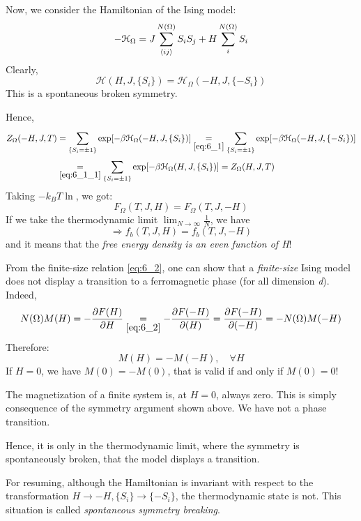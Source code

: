 \documentclass[../../Main/Main.tex]{subfiles}
\begin{document}
Now, we consider the Hamiltonian of the Ising model:
\begin{equation*}
  - \mathcal{H}_ \Omega  = J \sum_{\expval{ij} }^{N(\Omega )} S_i S_j + H \sum_{i}^{N(\Omega )} S_i
\end{equation*}
Clearly,
\begin{equation}
  \mathcal{H}(H,J, \{S_i\}) =   \mathcal{H}_ \Omega (-H,J, \{-S_i\})
  \label{eq:6_1_1}
\end{equation}
This is a spontaneous broken symmetry.

Hence,
\begin{equation}
  \begin{split}
Z_ \Omega  (-H,J,T) &= \sum_{ \{S_i = \pm 1 \}}^{} \exp [-\beta \mathcal{H}_ \Omega  (-H,J, \{S_i\})]  \underset{\eqref{eq:6_1}}{=}   \sum_{ \{S_i = \pm 1 \}}^{} \exp [-\beta \mathcal{H}_ \Omega  (-H,J,\{-S_i\})] \\
&\underset{\eqref{eq:6_1_1}}{=} \sum_{ \{S_i= \pm 1\}}^{} \exp [-\beta \mathcal{H}_ \Omega  (H,J, \{S_i\}) ] = Z_ \Omega (H,J,T)
\end{split}
\end{equation}
Taking \( -k_B T \ln  \), we got:
\begin{equation}
  F_ \Omega  (T,J,H) = F_ \Omega  (T,J,-H)
  \label{eq:6_2}
\end{equation}
If we take the thermodynamic limit \( \lim_{N \rightarrow \infty } \frac{1}{N} \), we have
\begin{equation}
\Rightarrow f_b (T,J,H) = f_b (T,J,-H)
\end{equation}
and it means that the \emph{free energy density is an even function of H}!
\begin{remark}
From the finite-size relation \eqref{eq:6_2}, one can show that a \emph{finite-size}  Ising model does not display a transition to a ferromagnetic phase (for all dimension \emph{d}). Indeed,
\begin{equation}
    N (\Omega ) M(H) = - \pdv{F (H)}{H} \underset{\eqref{eq:6_2}}{=}  - \pdv{F(-H)}{(H)} = \pdv{F(-H)}{(-H)}  = - N (\Omega ) M (-H)
\end{equation}
Therefore:
\begin{equation}
  M (H) = - M (-H), \quad \forall H
\end{equation}
If \( H=0 \), we have \( M (0) = -M (0) \), that is valid if and only if \( M(0)= 0 \)!

The magnetization of a finite system is, at \( H=0 \), always zero. This is simply consequence of the symmetry argument shown above. We have not a phase transition.

Hence, it is only in the thermodynamic limit, where the symmetry is spontaneously broken, that the model displays a transition.

For resuming, although the Hamiltonian is invariant with respect to the transformation \( H \rightarrow -H, \{ S_i \} \rightarrow \{-S_i\} \), the thermodynamic state is not. This situation is called \emph{spontaneous symmetry breaking}.
\end{remark}
\end{document}
